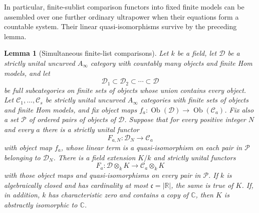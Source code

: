 \documentclass[11pt]{article}
\numberwithin{equation}{section}
\newtheorem{lemma}[theorem]{Lemma}
\theoremstyle{definition}
\theoremstyle{remark}
\begin{document}
In particular, finite-sublist comparison functors into fixed finite
models can be assembled over one further ordinary ultrapower when
their equations form a countable system.  Their linear
quasi-isomorphisms survive by the preceding lemma.

\begin{lemma}[Simultaneous finite-list comparisons]
\label{lem:finite-list-ultrapower}
Let $k$ be a field, let $\mathcal D$ be a strictly unital uncurved
$A_\infty$ category with countably many objects and finite Hom models,
and let
\[
 \mathcal D_1\subset\mathcal D_2\subset\cdots\subset\mathcal D
\]
be full subcategories on finite sets of objects whose union contains
every object.  Let $\mathcal C_1,\ldots,\mathcal C_s$ be strictly unital
uncurved $A_\infty$ categories with finite sets of objects and finite Hom
models, and fix object maps
$f_a:\operatorname{Ob}(\mathcal D)\to\operatorname{Ob}(\mathcal C_a)$.
Fix also a set $\mathcal P$ of ordered pairs of objects of $\mathcal D$.
Suppose that for every positive integer $N$ and every $a$ there is a
strictly unital functor
\[
 F_{a,N}:\mathcal D_N\longrightarrow\mathcal C_a
\]
with object map $f_a$, whose linear term is a quasi-isomorphism on each
pair in $\mathcal P$ belonging to $\mathcal D_N$.
There is a field extension $K/k$ and strictly unital functors
\[
 F_a:\mathcal D\otimes_k K\longrightarrow\mathcal C_a\otimes_k K
\]
with those object maps and quasi-isomorphisms on every pair in
$\mathcal P$.
If $k$ is algebraically closed and has cardinality at most
$\mathfrak c=|\mathbb R|$, the same is true of $K$.  If, in addition, $k$ has
characteristic zero and contains a copy of $\mathbb C$, then $K$ is abstractly
isomorphic to $\mathbb C$.
\end{lemma}
\end{document}
